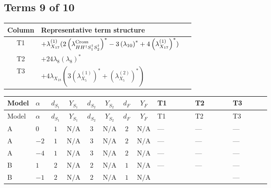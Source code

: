 \documentclass[8pt]{article}
\begin{document}
\begin{landscape}
\subsection*{Terms 9 of 10}
\begin{center}
\begin{tabular}{@{}c >{\raggedright\arraybackslash}p{0.82\linewidth}@{}}
\toprule
Column & Representative term structure \\
\midrule
T1 & \(\displaystyle +{\lambda_{X_{17}}^{(1)}} (2 \left({\lambda_{H H^\dagger S_1^\dagger S_2^\dagger}^{\rm Cross}}\right)^{*}-3 \left({\lambda_{10}}\right)^{*}+4 \left({\lambda_{X_{17}}^{(1)}}\right)^{*})\) \\
\midrule
T2 & \(\displaystyle +24 {\lambda_{8}} \left({\lambda_{8}}\right)^{*}\) \\
\midrule
T3 & \(\displaystyle +4 {\lambda_{X_{18}}} (3 \left({\lambda_{X_{5}}^{(1)}}\right)^{*}+\left({\lambda_{X_{5}}^{(2)}}\right)^{*})\) \\
\midrule
\bottomrule
\end{tabular}
\end{center}
\smallskip
\tiny
\begin{longtable}{@{}llcccccc >{\raggedright\arraybackslash}p{0.21\linewidth} >{\raggedright\arraybackslash}p{0.21\linewidth} >{\raggedright\arraybackslash}p{0.21\linewidth}@{}}
\toprule
Model & $\alpha$ & $d_{S_1}$ & $Y_{S_1}$ & $d_{S_2}$ & $Y_{S_2}$ & $d_F$ & $Y_F$ & T1 & T2 & T3 \\
\midrule
\endfirsthead
\toprule
Model & $\alpha$ & $d_{S_1}$ & $Y_{S_1}$ & $d_{S_2}$ & $Y_{S_2}$ & $d_F$ & $Y_F$ & T1 & T2 & T3 \\
\midrule
\endhead
A & $0$ & $1$ & $\text{N/A}$ & $3$ & $\text{N/A}$ & $2$ & $\text{N/A}$ & --- & --- & --- \\
\midrule
A & $-2$ & $1$ & $\text{N/A}$ & $3$ & $\text{N/A}$ & $2$ & $\text{N/A}$ & --- & --- & --- \\
\midrule
A & $-4$ & $1$ & $\text{N/A}$ & $3$ & $\text{N/A}$ & $2$ & $\text{N/A}$ & --- & --- & --- \\
\midrule
B & $1$ & $2$ & $\text{N/A}$ & $2$ & $\text{N/A}$ & $1$ & $\text{N/A}$ & --- & --- & --- \\
\midrule
B & $-1$ & $2$ & $\text{N/A}$ & $2$ & $\text{N/A}$ & $1$ & $\text{N/A}$ & \scriptsize\adjustbox{max width=\linewidth}{$\begin{gathered} +{\lambda_{X_{17}}^{(1)}} (2 \left({\lambda_{H H^\dagger S_1^\dagger S_2^\dagger}^{\rm Cross}}\right)^{*}-3 \left({\lambda_{10}}\right)^{*}+4 \left({\lambda_{X_{17}}^{(1)}}\right)^{*})\end{gathered}$} & \scriptsize\adjustbox{max width=\linewidth}{$\begin{gathered} +24 {\lambda_{8}} \left({\lambda_{8}}\right)^{*}\end{gathered}$} & --- \\

\end{longtable}
\end{landscape}
\end{document}
